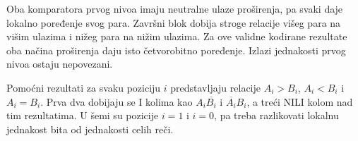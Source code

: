 Oba komparatora prvog nivoa imaju neutralne ulaze proširenja, pa svaki daje lokalno poređenje svog para. Završni blok dobija stroge relacije višeg para na višim ulazima i nižeg para na nižim ulazima. Za ove validne kodirane rezultate oba načina proširenja daju isto četvorobitno poređenje. Izlazi jednakosti prvog nivoa ostaju nepovezani.

Pomoćni rezultati za svaku poziciju $i$ predstavljaju relacije $A_i>B_i$, $A_i<B_i$ i $A_i=B_i$. Prva dva dobijaju se I kolima kao $A_i\overline{B_i}$ i $\overline{A_i}B_i$, a treći NILI kolom nad tim rezultatima. U šemi su pozicije $i=1$ i $i=0$, pa treba razlikovati lokalnu jednakost bita od jednakosti celih reči.
